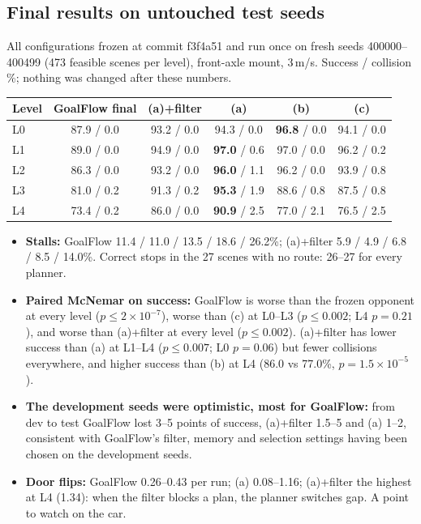 \documentclass[11pt,a4paper]{article}
\begin{document}
\subsection{Final results on untouched test seeds}
\label{sec:final}
All configurations frozen at commit f3f4a51 and run once on fresh seeds 400000--400499 (473 feasible scenes per
level), front-axle mount, 3\,m/s. Success / collision \%; nothing was changed after these numbers.
\begin{table}[H]
\small
\begin{tabular}{@{}lccccc@{}}
\toprule
Level & GoalFlow final & (a)+filter & (a) & (b) & (c) \\
\midrule
L0 & 87.9 / 0.0 & 93.2 / 0.0 & 94.3 / 0.0 & \textbf{96.8} / 0.0 & 94.1 / 0.0 \\
L1 & 89.0 / 0.0 & 94.9 / 0.0 & \textbf{97.0} / 0.6 & 97.0 / 0.0 & 96.2 / 0.2 \\
L2 & 86.3 / 0.0 & 93.2 / 0.0 & \textbf{96.0} / 1.1 & 96.2 / 0.0 & 93.9 / 0.8 \\
L3 & 81.0 / 0.2 & 91.3 / 0.2 & \textbf{95.3} / 1.9 & 88.6 / 0.8 & 87.5 / 0.8 \\
L4 & 73.4 / 0.2 & 86.0 / 0.0 & \textbf{90.9} / 2.5 & 77.0 / 2.1 & 76.5 / 2.5 \\
\bottomrule
\end{tabular}
\end{table}
\begin{itemize}[nosep]
  \item \textbf{Stalls:} GoalFlow 11.4 / 11.0 / 13.5 / 18.6 / 26.2\%; (a)+filter 5.9 / 4.9 / 6.8 / 8.5 / 14.0\%. Correct stops
        in the 27 scenes with no route: 26--27 for every planner.
  \item \textbf{Paired McNemar on success:} GoalFlow is worse than the frozen opponent at every level ($p\le2\times10^{-7}$),
        worse than (c) at L0--L3 ($p\le0.002$; L4 $p=0.21$), and worse than (a)+filter at every level ($p\le0.002$).
        (a)+filter has lower success than (a) at L1--L4 ($p\le0.007$; L0 $p=0.06$) but fewer collisions everywhere, and
        higher success than (b) at L4 (86.0 vs 77.0\%, $p=1.5\times10^{-5}$).
  \item \textbf{The development seeds were optimistic, most for GoalFlow:} from dev to test GoalFlow lost 3--5 points of
        success, (a)+filter 1.5--5 and (a) 1--2, consistent with GoalFlow's filter, memory and selection settings having
        been chosen on the development seeds.
  \item \textbf{Door flips:} GoalFlow 0.26--0.43 per run; (a) 0.08--1.16; (a)+filter the highest at L4 (1.34): when the
        filter blocks a plan, the planner switches gap. A point to watch on the car.
\end{itemize}
\end{document}
